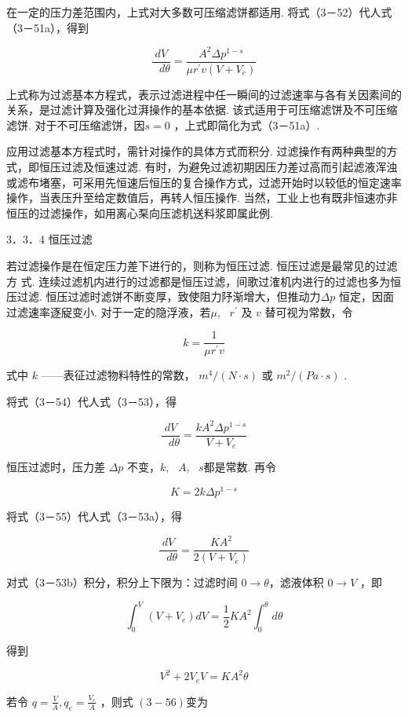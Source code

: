 \documentclass[
]{article}
\begin{document}
在一定的压力差范围内，上式对大多数可压缩滤饼都适用. 将式（3－52）代人式（3－51a），得到

\[\frac{dV}{\text{\ }d\theta} = \frac{A^{2}\Delta p^{1 - s}}{\mu r^{'}v\left( V + V_{e} \right)}\]

上式称为过滤基本方程式，表示过滤进程中任一瞬间的过滤速率与各有关因素间的关系，是过滤计算及强化过湃操作的基本依据. 该式适用于可压缩滤饼及不可压缩滤饼. 对于不可压缩滤饼，因\(s = 0\) ，上式即简化为式（3－51a）. 

应用过滤基本方程式时，需针对操作的具体方式而积分. 过滤操作有两种典型的方式，即恒压过滤及恒速过滤. 有时，为避免过滤初期因压力差过高而引起滤液浑浊或滤布堵塞，可采用先恒速后恒压的复合操作方式，过滤开始时以较低的恒定速率操作，当表压升至给定数值后，再转人恒压操作. 当然，工业上也有既非恒速亦非恒压的过滤操作，如用离心䂞向压滤机送料浆即属此例. 

3．3．4 恒压过滤

若过滤操作是在恒定压力差下进行的，则称为恒压过滤. 恒压过滤是最常见的过滤方
式. 连续过滤机内进行的过滤都是恒压过滤，间歌过㴶机内进行的过滤也多为恒压过滤. 恒压过滤时滤饼不断变厚，致使阻力䦽渐增大，但推动力\(\Delta p\) 恒定，因面过滤速率逐䟟变小. 对于一定的隐浮液，若\(\mu,\text{\ }r^{'}\) 及 \(v\) 替可视为常数，令

\[k = \frac{1}{\mu r^{'}v}\]

式中 \(k\) ------表征过滤物料特性的常数， \(m^{4}/(N \cdot s)\) 或
\(m^{2}/(Pa \cdot s)\) . 

将式（3－54）代人式（3－53），得

\[\frac{dV}{\text{\ }d\theta} = \frac{kA^{2}\Delta p^{1 - s}}{V + V_{e}}\]

恒压过滤时，压力差 \(\Delta p\) 不变，\(k,\text{\ }A,\text{\ }s\)都是常数. 再令

\[K = 2k\Delta p^{1 - s}\]

将式（3－55）代人式（3－53a），得

\[\frac{dV}{\text{\ }d\theta} = \frac{KA^{2}}{2\left( V + V_{e} \right)}\]

对式（3－53b）积分，积分上下限为：过滤时间 \(0 \rightarrow \theta\)，滤液体积 \(0 \rightarrow V\) ，即

\[\int_{0}^{V}\mspace{2mu}\left( V + V_{e} \right)dV = \frac{1}{2}KA^{2}\int_{0}^{\theta}\mspace{2mu} d\theta\]

得到

\[V^{2} + 2V_{e}V = KA^{2}\theta\]

若令 \(q = \frac{V}{A},q_{e} = \frac{V_{e}}{A}\) ，则式 \((3 - 56)\)变为
\end{document}

